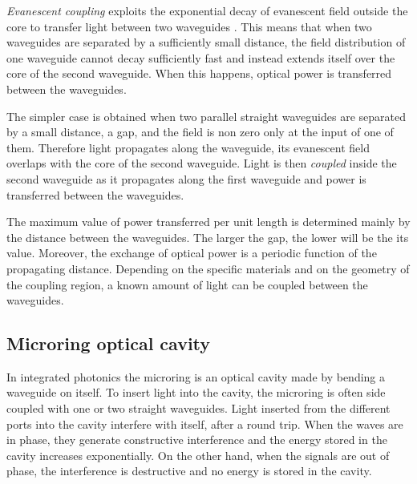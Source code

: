 \textit{Evanescent coupling} exploits the exponential decay of evanescent field outside the core to transfer light between two waveguides \cite{Reed2008}.
This means that when two waveguides are separated by a sufficiently small distance, the field distribution of one waveguide cannot decay sufficiently fast and instead extends itself over the core of the second waveguide.
When this happens, optical power is transferred between the waveguides.

The simpler case is obtained when two parallel straight waveguides are separated by a small distance, a gap, and the field is non zero only at the input of one of them.
Therefore light propagates along the waveguide, its evanescent field overlaps with the core of the second waveguide.
Light is then \textit{coupled} inside the second waveguide as it propagates along the first waveguide and power is transferred between the waveguides.

The maximum value of power transferred per unit length is determined mainly by the distance between the waveguides.
The larger the gap, the lower will be the its value.
Moreover, the exchange of optical power is a periodic function of the propagating distance.
Depending on the specific materials and on the geometry of the coupling region, a known amount of light can be coupled between the waveguides.

\newpage
\subsection{Microring optical cavity}
\label{ssec:Microring_optical_cavity}
In integrated photonics the microring is an optical cavity made by bending a waveguide on itself.
To insert light into the cavity, the microring is often side coupled with one or two straight waveguides.
Light inserted from the different ports into the cavity interfere with itself, after a round trip.
When the waves are in phase, they generate constructive interference and the energy stored in the cavity increases exponentially.
On the other hand, when the signals are out of phase, the interference is destructive and no energy is stored in the cavity.

